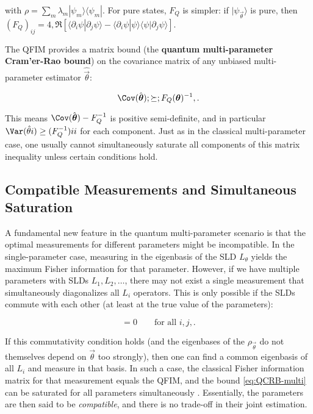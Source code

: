 with $\rho = \sum_m \lambda_m |\psi_m\rangle\langle \psi_m|$. For pure states, $F_Q$ is simpler: if $|\psi_{\vec{\theta}}\rangle$ is pure, then $(F_Q)_{ij} = 4,\Re[\langle \partial_i \psi | \partial_j \psi \rangle - \langle \partial_i \psi|\psi\rangle\langle\psi|\partial_j \psi\rangle]$.



The QFIM provides a matrix bound (the \textbf{quantum multi-parameter
  Cram'er-Rao bound}) on the covariance matrix of any unbiased
multi-parameter estimator $\hat{\vec{\theta}}$:

\begin{equation}

\Cov(\hat{\vec{\theta}}) ;\succeq; F_Q(\vec{\theta})^{-1} ,.

\label{eq:QCRB-multi}

\end{equation}

This means $ \Cov(\hat{\vec{\theta}}) - F_Q^{-1}$ is positive
semi-definite, and in particular $\Var(\hat{\theta}i) \ge
(F_Q^{-1}){ii}$ for each component. Just as in the classical
multi-parameter case, one usually cannot simultaneously saturate all
components of this matrix inequality unless certain conditions hold.



\subsection{Compatible Measurements and Simultaneous Saturation}



A fundamental new feature in the quantum multi-parameter scenario is
that the optimal measurements for different parameters might be
incompatible. In the single-parameter case, measuring in the
eigenbasis of the SLD $L_\theta$ yields the maximum Fisher information
for that parameter. However, if we have multiple parameters with SLDs
$L_1, L_2, \ldots$, there may not exist a single measurement that
simultaneously diagonalizes all $L_i$ operators. This is only possible
if the SLDs commute with each other (at least at the true value of the
parameters):

\begin{equation}
[L_i, L_j] = 0 \qquad \text{for all } i,j ,.
\label{eq:SLD-comm}
\end{equation}

If this commutativity condition holds (and the eigenbases of the
$\rho_{\vec{\theta}}$ do not themselves depend on $\vec{\theta}$ too
strongly), then one can find a common eigenbasis of all $L_i$ and
measure in that basis. In such a case, the classical Fisher
information matrix for that measurement equals the QFIM, and the bound
\eqref{eq:QCRB-multi} can be saturated for all parameters
simultaneously \cite{Ragy2016}. Essentially, the parameters are then
said to be \textit{compatible}, and there is no trade-off in their
joint estimation.



